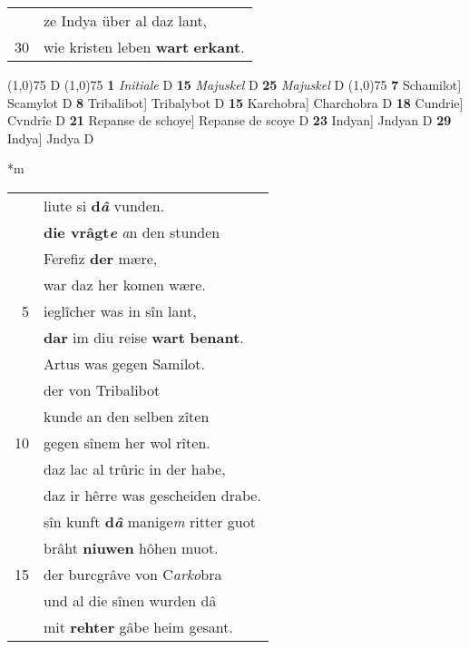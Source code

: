 \documentclass[8pt,a4paper,notitlepage]{article}
\begin{document}
\begin{table}[ht]
\begin{minipage}[t]{0.5\linewidth}
\begin{tabular}{rl}
 & ze Indya über al daz lant,\\ 
30 & wie kristen leben \textbf{wart} \textbf{erkant}.\\ 
\end{tabular}
\scriptsize
\line(1,0){75} \newline
D \newline
\line(1,0){75} \newline
\textbf{1} \textit{Initiale} D  \textbf{15} \textit{Majuskel} D  \textbf{25} \textit{Majuskel} D  \newline
\line(1,0){75} \newline
\textbf{7} Schamilot] Scamylot D \textbf{8} Tribalibot] Tribalybot D \textbf{15} Karchobra] Charchobra D \textbf{18} Cundrie] Cvndrîe D \textbf{21} Repanse de schoye] Repanse de scoye D \textbf{23} Indyan] Jndyan D \textbf{29} Indya] Jndya D \newline
\end{minipage}
\hspace{0.5cm}
\begin{minipage}[t]{0.5\linewidth}
\small
\begin{center}*m
\end{center}
\begin{tabular}{rl}
 & liute si \textbf{d\textit{â}} vunden.\\ 
 & \textbf{die vrâgt\textit{e}} \textit{a}n den stunden\\ 
 & Ferefiz \textbf{der} mære,\\ 
 & war daz her komen wære.\\ 
5 & ieglîcher was in sîn lant,\\ 
 & \textbf{dar} im diu reise \textbf{wart} \textbf{benant}.\\ 
 & Artus was gegen Samilot.\\ 
 & der von Tribalibot\\ 
 & kunde an den selben zîten\\ 
10 & gegen sînem her wol rîten.\\ 
 & daz lac al trûric in der habe,\\ 
 & daz ir hêrre was gescheiden drabe.\\ 
 & sîn kunft \textbf{d\textit{â}} manige\textit{m} ritter guot\\ 
 & brâht \textbf{niuwen} hôhen muot.\\ 
15 & der burcgrâve von C\textit{arko}bra\\ 
 & und al die sînen wurden dâ\\ 
 & mit \textbf{rehter} gâbe heim gesant.\\ 

\end{tabular}
\end{minipage}
\end{table}
\end{document}
